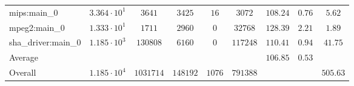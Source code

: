 \begin{tabular}{|l|c|c|c|c|c|c|c|c|}
mips:main\_0            & $ 3.364 \cdot 10^{1} $ & $ 3641    $ & $ 3425   $ & $ 16   $ & $ 3072   $ & $ 108.24      $ & $ 0.76    $ & $ 5.62    $ \\
mpeg2:main\_0           & $ 1.333 \cdot 10^{1} $ & $ 1711    $ & $ 2960   $ & $ 0    $ & $ 32768  $ & $ 128.39      $ & $ 2.21    $ & $ 1.89    $ \\
sha\_driver:main\_0     & $ 1.185 \cdot 10^{3} $ & $ 130808  $ & $ 6160   $ & $ 0    $ & $ 117248 $ & $ 110.41      $ & $ 0.94    $ & $ 41.75   $ \\
\hline
Average                 & $                    $ & $         $ & $        $ & $      $ & $        $ & $ 106.85      $ & $ 0.53    $ & $         $ \\
\hline
Overall                 & $ 1.185 \cdot 10^{4} $ & $ 1031714 $ & $ 148192 $ & $ 1076 $ & $ 791388 $ & $             $ & $         $ & $ 505.63  $ \\
\hline
\end{tabular}
